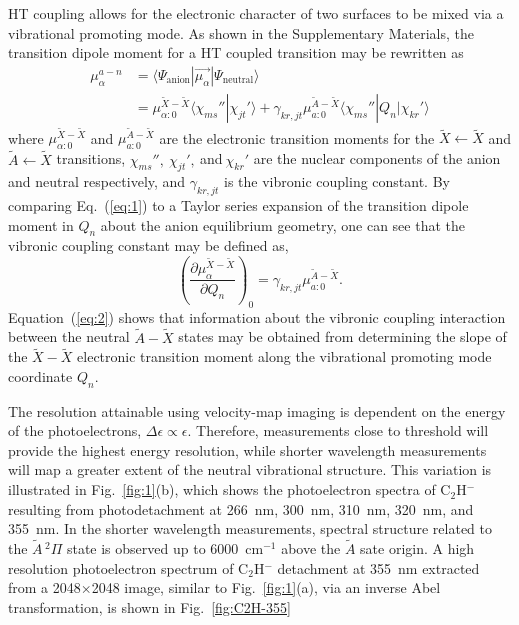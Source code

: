 \documentclass[journal=jpcafh,manuscript=article,layout=onecolumn, 12pt]{achemso}
\begin{document}
HT coupling allows for the electronic character of two surfaces to be mixed via a vibrational promoting mode. As shown in the Supplementary Materials, the transition dipole moment for a HT coupled transition may be rewritten as
\begin{align}
\mu_{\alpha}^{a-n} &= \langle \Psi_{\text{anion}}|\vec{\mu_{\alpha}}|\Psi_{\text{neutral}}\rangle\\
&= \mu_{\alpha:0}^{\tilde{X}-\tilde{X}}\langle\chi_{ms}''|\chi_{jt}'\rangle+\gamma_{kr,jt}\mu_{a:0}^{\tilde{A}-\tilde{X}}\langle\chi_{ms}''|Q_n|\chi_{kr}'\rangle
\label{eq:1}
\end{align}  
where $\mu_{\alpha:0}^{\tilde{X}-\tilde{X}}$ and $\mu_{a:0}^{\tilde{A}-\tilde{X}}$ are the electronic transition moments for the $\tilde{X}\leftarrow\tilde{X}$ and $\tilde{A}\leftarrow\tilde{X}$ transitions, $\chi_{ms}'',~\chi_{jt}',~$and$~\chi_{kr}'$ are the nuclear components of the anion and neutral respectively, and $\gamma_{kr,jt}$ is the vibronic coupling constant. By comparing Eq.~(\ref{eq:1}) to a Taylor series expansion of the transition dipole moment in $Q_n$ about the anion equilibrium geometry, one can see that the vibronic coupling constant may be defined as,
\begin{equation}
\left(\frac{\partial\mu_{\alpha}^{\tilde{X}-\tilde{X}}}{\partial Q_n}\right)_0 = \gamma_{kr,jt}\mu_{a:0}^{\tilde{A}-\tilde{X}}.
\label{eq:2}
\end{equation}
Equation~(\ref{eq:2}) shows that information about the vibronic coupling interaction between the neutral $\tilde{A}-\tilde{X}$ states may be obtained from determining the slope of the $\tilde{X}-\tilde{X}$ electronic transition moment along the vibrational promoting mode coordinate $Q_n$.




The resolution attainable using velocity-map imaging is dependent on the energy of the photoelectrons, $\Delta\epsilon\propto\epsilon$. Therefore, measurements close to threshold will provide the highest energy resolution, while shorter wavelength measurements will map a greater extent of the neutral vibrational structure. This variation is illustrated in Fig.~\ref{fig:1}(b), which shows the photoelectron spectra of C$_2$H$^-$ resulting from photodetachment at 266~nm, 300~nm, 310~nm, 320~nm, and 355~nm. In the shorter wavelength measurements, spectral structure related to the $\tilde{A}\,^2\Pi$ state is observed up to 6000~cm$^{-1}$ above the $\tilde{A}$ sate origin. A high resolution photoelectron spectrum of C$_2$H$^-$ detachment at 355~nm extracted from a 2048$\times$2048 image, similar to Fig.~\ref{fig:1}(a), via an inverse Abel transformation, is shown in Fig.~\ref{fig:C2H-355}
\end{document}
